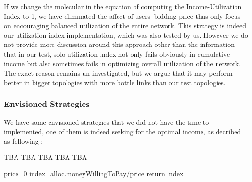 \documentclass[a4paper,11pt,twocolumn]{article}
\begin{document}
If we change the  molecular in the equation of computing the Income-Utilization Index to 1, we have eliminated the affect of users' bidding price thus only focus on encouraging balanced utilization of the entire network. This strategy is indeed our utilization index implementation, which was also  tested by us. However we do not provide more discussion around this approach other than the information that in our test, solo utilization index not only fails obviously  in cumulative income but also sometimes fails in optimizing overall utilization of the network. The exact reason remains un-investigated, but we argue that it may perform better in bigger topologies with more bottle links than our test topologies.


\subsubsection{Envisioned Strategies}
We have some envisioned strategies that we did not have the time to implemented, one of them is indeed seeking for the optimal income, as decribed as following :

\providecommand{\SetAlgoLined}{\SetLine}
\providecommand{\DontPrintSemicolon}{\dontprintsemicolon}
\vspace{5mm}
\begin{algorithm}[H]
\caption{TBA TBA TBA TBA TBA}

\SetAlgoLined
 price=0\;
index=alloc.moneyWillingToPay/price\;
return index\;
\end{algorithm}


\end{document}
